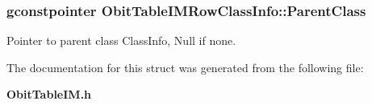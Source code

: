 \subsubsection{\setlength{\rightskip}{0pt plus 5cm}gconstpointer {\bf Obit\-Table\-IMRow\-Class\-Info::Parent\-Class}}\label{structObitTableIMRowClassInfo_o3}


Pointer to parent class Class\-Info, Null if none. 



The documentation for this struct was generated from the following file:\begin{CompactItemize}
\item 
{\bf Obit\-Table\-IM.h}\end{CompactItemize}

